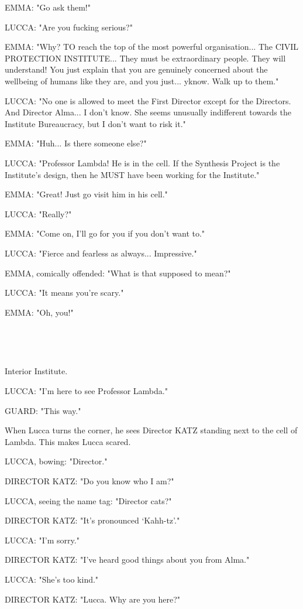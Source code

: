 \documentclass[11pt]{article}
\begin{document}
EMMA: "Go ask them!"

LUCCA: "Are you fucking serious?"

EMMA: "Why? 
TO reach the top of the most powerful organisation... The CIVIL PROTECTION INSTITUTE... They must be extraordinary people.
They will understand!
You just explain that you are genuinely concerned about the wellbeing of humans like they are, and you just... yknow. 
Walk up to them."

LUCCA: "No one is allowed to meet the First Director except for the Directors. 
And Director Alma...
I don't know. 
She seems unusually indifferent towards the Institute Bureaucracy, but I don't want to risk it."

EMMA: "Huh... Is there someone else?"

LUCCA: "Professor Lambda! He is in the cell. 
If the Synthesis Project is the Institute's design, then he MUST have been working for the Institute."

EMMA: "Great! Just go visit him in his cell."

LUCCA: "Really?"

EMMA: "Come on, I'll go for you if you don't want to."

LUCCA: "Fierce and fearless as always... Impressive."

EMMA, comically offended: "What is that supposed to mean?"

LUCCA: "It means you're scary."

EMMA: "Oh, you!"

\ 

\ 

Interior Institute.

LUCCA: "I'm here to see Professor Lambda."

GUARD: "This way."

When Lucca turns the corner, he sees Director KATZ standing next to the cell of Lambda.
This makes Lucca scared.

LUCCA, bowing: "Director."

DIRECTOR KATZ: "Do you know who I am?"

LUCCA, seeing the name tag: "Director cats?"

DIRECTOR KATZ: "It's pronounced `Kahh-tz'."

LUCCA: "I'm sorry."

DIRECTOR KATZ: "I've heard good things about you from Alma."

LUCCA: "She's too kind."

DIRECTOR KATZ: "Lucca. Why are you here?"
\end{document}
